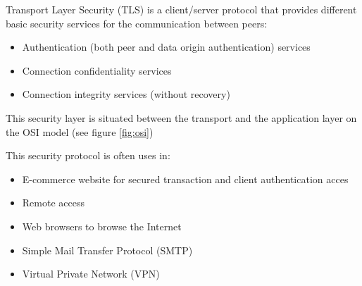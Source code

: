 Transport Layer Security (TLS) is a client/server protocol that provides
different basic security services for the communication between peers:
\begin{itemize}
  \item Authentication (both peer and data origin authentication)
  services
  \item Connection confidentiality services
  \item Connection integrity services (without recovery)
\end{itemize}

This security layer is situated between the transport and the application layer
on the OSI model (see figure \ref{fig:osi})

This security protocol is often uses in:
\begin{itemize}
  \item E-commerce website for secured transaction and client authentication
  acces
  \item Remote access
  \item Web browsers to browse the Internet
  \item Simple Mail Transfer Protocol (SMTP)
  \item Virtual Private Network (VPN)
\end{itemize}

